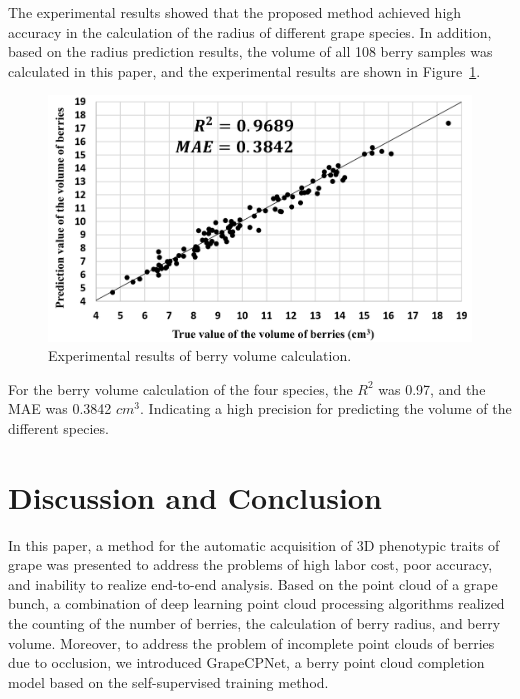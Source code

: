 \documentclass[12pt]{article}
\begin{document}
The experimental results showed that the proposed method achieved high accuracy in the calculation of the radius of different grape species. 
In addition, based on the radius prediction results, the volume of all 108 berry samples was calculated in this paper, and the experimental results are shown in Figure~\ref{fig:raw18}.

\begin{figure}[hbt!]
    \centering
    \includegraphics[width=1\textwidth]{figures/Figure15.pdf}
    \caption{Experimental results of berry volume calculation.}
    \label{fig:raw18}
\end{figure}

For the berry volume calculation of the four species, the $R^2$ was 0.97, and the MAE was 0.3842 $cm^3$. Indicating a high precision for predicting the volume of the different species.

\section{Discussion and Conclusion}

In this paper, a method for the automatic acquisition of 3D phenotypic traits of grape was presented to address the problems of high labor cost, poor accuracy, and inability to realize end-to-end analysis. 
Based on the point cloud of a grape bunch, a combination of deep learning point cloud processing algorithms realized the counting of the number of berries, the calculation of berry radius, and berry volume. 
Moreover, to address the problem of incomplete point clouds of berries due to occlusion, we introduced GrapeCPNet, a berry point cloud completion model based on the self-supervised training method.
\end{document}

